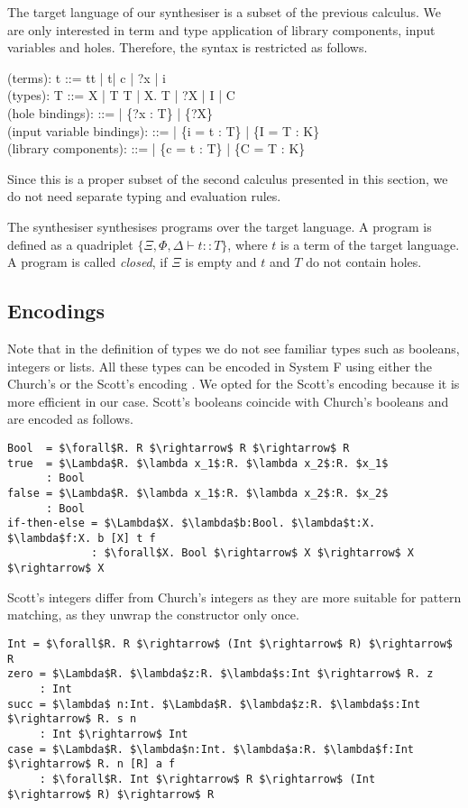 The target language of our synthesiser is a subset of the previous calculus. We are only interested in term and type application of library components, input variables and holes. Therefore, the syntax is restricted as follows.
 \begin{plstx}
(terms): t ::= t\;t | t\;[T] | c | ?x | i\\
(types): T ::= X | T \rightarrow T | \forall X.\; T | ?X | I | C\;[T,\ldots, T]\\
(hole bindings): \Xi ::= \emptyset | \Xi \cup \{{?x} : T\} | \Xi \cup \{{?X}\}\\
(input variable bindings): \Phi ::= \emptyset | \Phi \cup \{i = t : T\} | \Phi \cup \{I = T : K\}\\
(library components): \Delta ::= \emptyset | \Delta \cup \{c = t : T\} | \Delta \cup \{C = T : K\}\\
\end{plstx}
Since this is a proper subset of the second calculus presented in this section, we do not need separate typing and evaluation rules.

The synthesiser synthesises programs over the target language. A program is defined as a quadriplet $\{\Xi, \Phi, \Delta \vdash t :: T\}$, where $t$ is a term of the target language.
A program is called \emph{closed}, if $\Xi$ is empty and $t$ and $T$ do not contain holes.

  \subsection{Encodings}
Note that in the definition of types we do not see familiar types such as booleans, integers or lists. All these types can be encoded in System F using either the Church's or the Scott's encoding \cite{ScottNumerals}. We opted for the Scott's encoding because it is more efficient in our case.
Scott's booleans coincide with Church's booleans and are encoded as follows.
\begin{lstlisting}[style=plain, mathescape]
Bool  = $\forall$R. R $\rightarrow$ R $\rightarrow$ R
true  = $\Lambda$R. $\lambda x_1$:R. $\lambda x_2$:R. $x_1$
      : Bool
false = $\Lambda$R. $\lambda x_1$:R. $\lambda x_2$:R. $x_2$
      : Bool
if-then-else = $\Lambda$X. $\lambda$b:Bool. $\lambda$t:X. $\lambda$f:X. b [X] t f
             : $\forall$X. Bool $\rightarrow$ X $\rightarrow$ X $\rightarrow$ X
\end{lstlisting}

Scott's integers differ from Church's integers as they are more suitable for pattern matching, as they unwrap the constructor only once.
\begin{lstlisting}[style=plain, mathescape]
Int = $\forall$R. R $\rightarrow$ (Int $\rightarrow$ R) $\rightarrow$ R
zero = $\Lambda$R. $\lambda$z:R. $\lambda$s:Int $\rightarrow$ R. z
     : Int
succ = $\lambda$ n:Int. $\Lambda$R. $\lambda$z:R. $\lambda$s:Int $\rightarrow$ R. s n
     : Int $\rightarrow$ Int
case = $\Lambda$R. $\lambda$n:Int. $\lambda$a:R. $\lambda$f:Int $\rightarrow$ R. n [R] a f
     : $\forall$R. Int $\rightarrow$ R $\rightarrow$ (Int $\rightarrow$ R) $\rightarrow$ R
\end{lstlisting}


